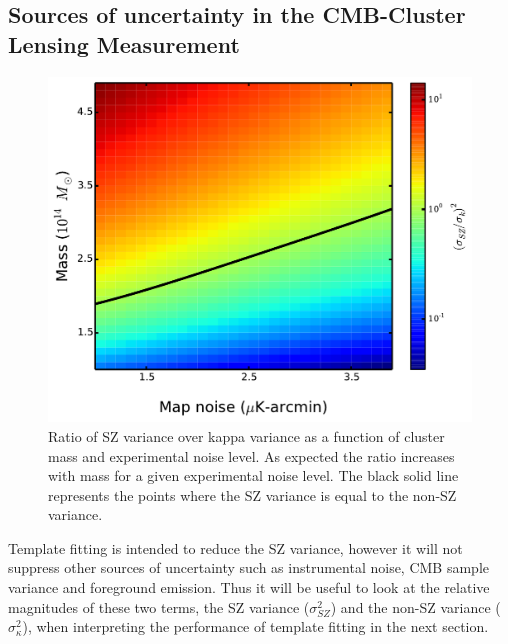 \subsection{Sources of uncertainty in the CMB-Cluster Lensing Measurement}
\begin{figure}[htb]
\includegraphics[width=\linewidth, keepaspectratio]{figs/contour_plot.pdf}
 \caption{
 Ratio of SZ variance over kappa variance as a function of cluster mass and experimental noise level. 
 As expected the ratio increases with mass for a given experimental noise level. 
 The black solid line represents the points where the SZ variance is equal to the non-SZ variance.
  }
 \label{fig:variance}
\end{figure}

Template fitting is intended to reduce the SZ variance, however it will not suppress other sources of uncertainty such as instrumental noise, CMB sample variance and foreground emission. 
Thus it will be useful to look at the relative magnitudes of these two terms, the SZ variance ($\sigma_{SZ}^{2}$) and the non-SZ variance ($\sigma_{\kappa}^{2}$), when interpreting the performance of template fitting in the next section. 


